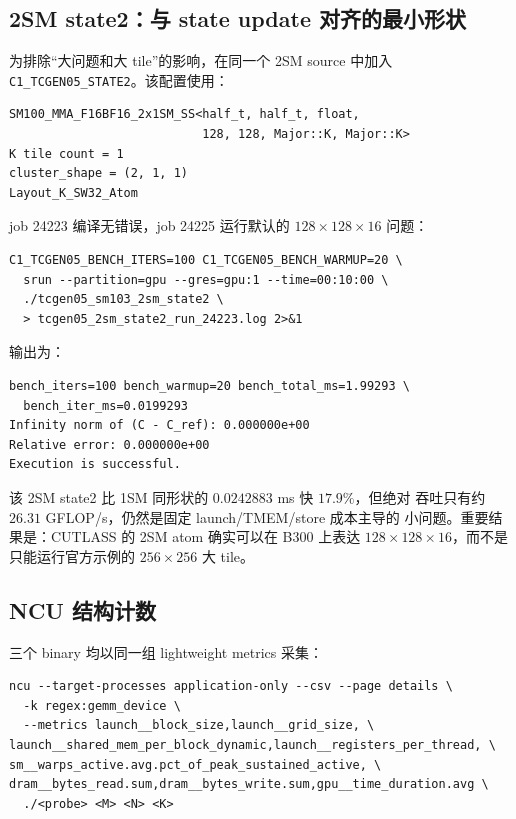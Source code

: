 \documentclass[11pt,a4paper,fontset=none]{ctexart}
\newcommand{\code}[1]{\texttt{#1}}
\begin{document}
\subsection{2SM state2：与 state update 对齐的最小形状}

为排除“大问题和大 tile”的影响，在同一个 2SM source 中加入
\code{C1\_TCGEN05\_STATE2}。该配置使用：

\begin{lstlisting}
SM100_MMA_F16BF16_2x1SM_SS<half_t, half_t, float,
                           128, 128, Major::K, Major::K>
K tile count = 1
cluster_shape = (2, 1, 1)
Layout_K_SW32_Atom
\end{lstlisting}

job 24223 编译无错误，job 24225 运行默认的 \(128\times128\times16\)
问题：

\begin{lstlisting}
C1_TCGEN05_BENCH_ITERS=100 C1_TCGEN05_BENCH_WARMUP=20 \
  srun --partition=gpu --gres=gpu:1 --time=00:10:00 \
  ./tcgen05_sm103_2sm_state2 \
  > tcgen05_2sm_state2_run_24223.log 2>&1
\end{lstlisting}

输出为：

\begin{lstlisting}
bench_iters=100 bench_warmup=20 bench_total_ms=1.99293 \
  bench_iter_ms=0.0199293
Infinity norm of (C - C_ref): 0.000000e+00
Relative error: 0.000000e+00
Execution is successful.
\end{lstlisting}

该 2SM state2 比 1SM 同形状的 \(0.0242883\) ms 快 \(17.9\%\)，但绝对
吞吐只有约 \(26.31\) GFLOP/s，仍然是固定 launch/TMEM/store 成本主导的
小问题。重要结果是：CUTLASS 的 2SM atom 确实可以在 B300 上表达
\(128\times128\times16\)，而不是只能运行官方示例的 \(256\times256\)
大 tile。

\subsection{NCU 结构计数}

三个 binary 均以同一组 lightweight metrics 采集：

\begin{lstlisting}
ncu --target-processes application-only --csv --page details \
  -k regex:gemm_device \
  --metrics launch__block_size,launch__grid_size, \
launch__shared_mem_per_block_dynamic,launch__registers_per_thread, \
sm__warps_active.avg.pct_of_peak_sustained_active, \
dram__bytes_read.sum,dram__bytes_write.sum,gpu__time_duration.avg \
  ./<probe> <M> <N> <K>
\end{lstlisting}
\end{document}
